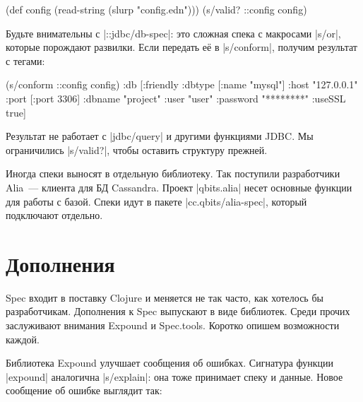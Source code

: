 \begin{english}
  \begin{clojure}
(def config (read-string (slurp "config.edn")))
(s/valid? ::config config)
  \end{clojure}
\end{english}

\label{jdbc-conform-warning}


Будьте внимательны с \spverb|::jdbc/db-spec|: это сложная спека с макросами
\spverb|s/or|, которые порождают развилки. Если передать е\"{е} в
\spverb|s/conform|, получим результат с тегами:

\begin{english}
  \begin{clojure}
(s/conform ::config config)
{:db
 [:friendly
  {:dbtype   [:name "mysql"]
   :host     "127.0.0.1"
   :port     [:port 3306]
   :dbname   "project"
   :user     "user"
   :password "********"
   :useSSL   true}]}
  \end{clojure}
\end{english}

Результат не работает с \spverb|jdbc/query| и другими функциями JDBC. Мы
ограничились \spverb|s/valid?|, чтобы оставить структуру прежней.


Иногда спеки выносят в отдельную библиотеку. Так поступили разработчики
Alia~--- клиента для БД
Cassandra. Проект \spverb|qbits.alia| несет основные функции для работы с
базой. Спеки идут в пакете \spverb|cc.qbits/alia-spec|, который подключают
отдельно.

\section{Дополнения}

Spec входит в поставку Clojure и меняется не так часто, как хотелось бы
разработчикам. Дополнения к Spec выпускают в виде библиотек. Среди прочих
заслуживают внимания Expound и Spec.tools. Коротко опишем возможности каждой.


Библиотека Expound улучшает сообщения об
ошибках. Сигнатура функции \spverb|expound| аналогична \spverb|s/explain|: она
тоже принимает спеку и данные. Новое сообщение об ошибке выглядит так:


